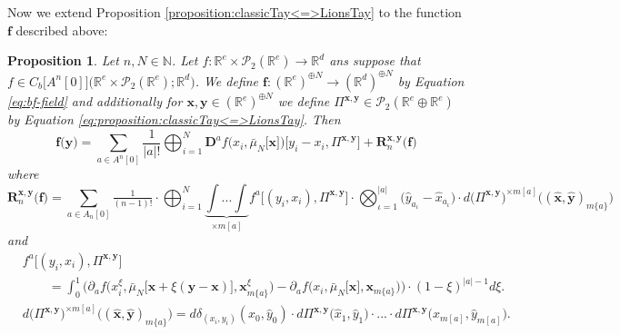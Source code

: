 \documentclass[a4paper,11pt,twoside]{article}
\numberwithin{equation}{section}
\theoremstyle{plain}
\newtheorem{proposition}[theorem]{Proposition}
\newcommand{\bN}{\mathbb{N}}
\newcommand{\bR}{\mathbb{R}}
\newcommand{\cP}{\mathcal{P}}
\newcommand{\rD}{\mathbf{D}}
\newcommand{\1}{\mathbbm{1}}
\begin{document}
	Now we extend Proposition \ref{proposition:classicTay<=>LionsTay} to the function $\boldsymbol{f}$ described above:
	\begin{proposition}
		\label{proposition:classicTay<=>LionsTay*}
		Let $n, N\in \bN$. Let $f: \bR^e \times \cP_2(\bR^e) \to \bR^d$ ans suppose that $f\in C_b\big[A^{n}[0]\big]\big( \bR^e \times \cP_2(\bR^e); \bR^d\big)$. We define $\boldsymbol{f}: (\bR^e)^{\oplus N} \to (\bR^d)^{\oplus N}$ by Equation \eqref{eq:bf-field} and additionally for $\boldsymbol{x}, \boldsymbol{y}\in (\bR^e)^{\oplus N}$ we define $\Pi^{\boldsymbol{x}, \boldsymbol{y}} \in \cP_2(\bR^e \oplus \bR^e)$ by Equation \eqref{eq:proposition:classicTay<=>LionsTay}. Then
		\begin{equation}
			\label{eq:proposition:classicTay<=>LionsTay*}
			\boldsymbol{f}\Big( \boldsymbol{y} \Big) = \sum_{a\in A^{n}[0]} \frac{1}{|a|!} \bigoplus_{i=1}^N \rD^a f \Big( x_i, \bar{\mu}_N\big[ \boldsymbol{x} \big] \Big)\Big[ y_i - x_i, \Pi^{\boldsymbol{x}, \boldsymbol{y}} \Big] + \boldsymbol{R}_n^{\boldsymbol{x}, \boldsymbol{y}}\big( \boldsymbol{f} \big)
		\end{equation}
		where
		\begin{equation*}
			\boldsymbol{R}_n^{\boldsymbol{x}, \boldsymbol{y}}\big( \boldsymbol{f} \big) 
			= \sum_{a\in A_n[0]} \tfrac{1}{(n-1)!} \cdot \bigoplus_{i = 1}^N \underbrace{\int ... \int}_{\times m[a]} f^a\big[ (y_i, x_i), \Pi^{\boldsymbol{x}, \boldsymbol{y}} \big] \cdot \bigotimes_{\iota = 1}^{|a|} \big( \hat{y}_{a_{\iota}} - \hat{x}_{a_{\iota}} \big) \cdot d\big( \Pi^{\boldsymbol{x}, \boldsymbol{y}} \big)^{\times m[a]} \Big( (\hat{\boldsymbol{x}}, \hat{\boldsymbol{y}})_{m\{a\}} \Big)
		\end{equation*}
		and
		\begin{align*}
			&f^a\big[ (y_i, x_i), \Pi^{\boldsymbol{x}, \boldsymbol{y}} \big] 
			\\
			&\qquad = \int_0^1 \bigg( \partial_a f\Big( x_i^{\xi}, \bar{\mu}_N \big[ \boldsymbol{x}+\xi(\boldsymbol{y}-\boldsymbol{x}) \big], \boldsymbol{x}_{m\{a\}}^{\xi} \Big) - \partial_a f\Big( x_i, \bar{\mu}_N\big[ \boldsymbol{x} \big], \boldsymbol{x}_{m\{a\}} \Big) \bigg) \cdot (1-\xi)^{|a| - 1} d\xi. 
			\\
			&d\big( \Pi^{\boldsymbol{x}, \boldsymbol{y}} \big)^{\times m[a]} \Big( (\hat{\boldsymbol{x}}, \hat{\boldsymbol{y}})_{m\{a\}} \Big) 
			= 
			d\delta_{(x_i, y_i)} (\hat{x}_0, \hat{y}_0) \cdot d\Pi^{\boldsymbol{x}, \boldsymbol{y}}\big( \hat{x}_1, \hat{y}_1 \big) \cdot ... \cdot d\Pi^{\boldsymbol{x}, \boldsymbol{y}}\big( \hat{x}_{m[a]}, \hat{y}_{m[a]} \big). 
		\end{align*}
	

\end{proposition}
\end{document}
